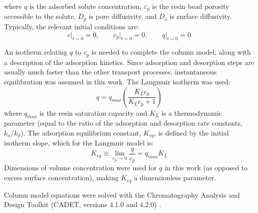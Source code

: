 \documentclass[preprint,review,12pt]{elsarticle}
\begin{document}
        where $q$ is the adsorbed solute concentration, $\varepsilon_p$ is the resin bead porosity accessible to the solute, $D_p$ is pore diffusivity, and $D_s$ is surface diffusivity. Typically, the relevant initial conditions are:
        \begin{equation} \label{eq:ic}
            c\big|_{t=0} = 0, \qquad c_p\big|_{t=0} = 0, \qquad q\big|_{t=0} = 0
        \end{equation}

        An isotherm relating $q$ to $c_p$ is needed to complete the column model, along with a description of the adsorption kinetics. Since adsorption and desorption steps are usually much faster than the other transport processes, instantaneous equilibration was assumed in this work. The Langmuir isotherm was used:
        \begin{equation} \label{eq:langmuir_ss}
            q = q_{max} \left( \frac{K_L c_p}{K_L c_p + 1} \right)
        \end{equation}
        where $q_{max}$ is the resin saturation capacity and $K_L$ is a thermodynamic parameter (equal to the ratio of the adsorption and desorption rate constants, $k_a/k_d$). The adsorption equilibrium constant, $K_{eq}$, is defined by the initial isotherm slope, which for the Langmuir model is:
        \begin{equation} \label{eq:langmuir_keq}
            K_{eq} \equiv \lim_{c_p \to 0} \frac{q}{c_p} = q_{max} K_L
        \end{equation}
        Dimensions of volume concentration were used for $q$ in this work (as opposed to excess surface concentration), making $K_{eq}$ a dimensionless parameter.

        Column model equations were solved with the Chromatography Analysis and Design Toolkit (CADET, versions 4.1.0 and 4.2.0) \cite{Leweke2018}.
\end{document}
